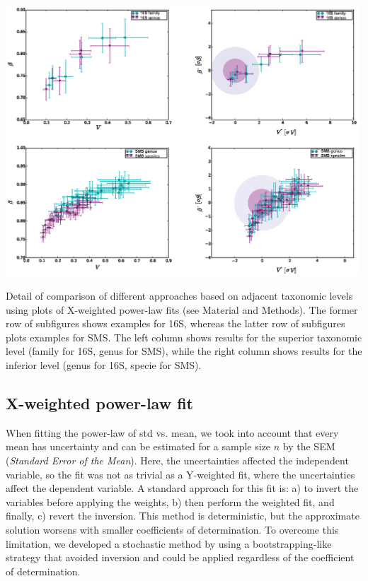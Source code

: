 \begin{supfig} 
  \includegraphics[width=0.99\textwidth]{figs/supfig_taxlev1.eps}
\caption{Detail of comparison of different approaches based on adjacent taxonomic levels using plots of X-weighted power-law fits (see Material and Methods). The former row of subfigures shows examples for 16S, whereas the latter row of subfigures plots examples for SMS. The left column shows results for the superior taxonomic level (family for 16S, genus for SMS), while the right column shows results for the inferior level (genus for 16S, specie for SMS).}
\label{supfig:taxlev2}
\end{supfig}

\subsection*{X-weighted power-law fit}\label{sec:X-w}

When fitting the power-law of std vs. mean, we took into account that every mean has uncertainty and can be estimated for a sample size $n$ by the SEM (\emph{Standard Error of the Mean}). Here, the uncertainties affected the independent variable, so the fit was not as trivial as a Y-weighted fit, where the uncertainties affect the dependent variable. A standard approach for this fit is: a) to invert the variables before applying the weights, b) then perform the weighted fit, and finally, c) revert the inversion. This method is deterministic, but the approximate solution worsens with smaller coefficients of determination. To overcome this limitation, we developed a stochastic method by using a bootstrapping-like strategy that avoided inversion and could be applied regardless of the coefficient of determination.

